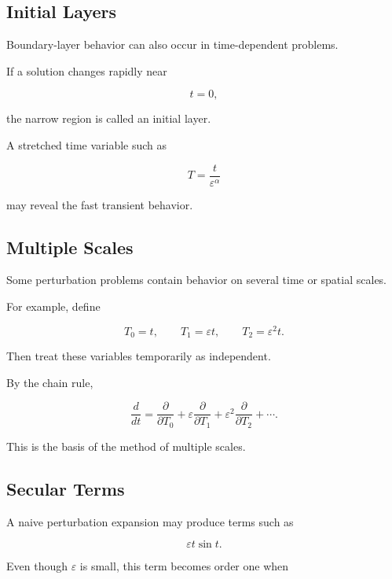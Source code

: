 \subsection{Initial Layers}
\label{subsec:initial-layers}

Boundary-layer behavior can also occur in time-dependent problems.

If a solution changes rapidly near

\[
t=0,
\]

the narrow region is called an initial layer.

A stretched time variable such as

\[
\boxed{
T=\frac{t}{\varepsilon^\alpha}
}
\]

may reveal the fast transient behavior.

\subsection{Multiple Scales}
\label{subsec:multiple-scales}

Some perturbation problems contain behavior on several time or spatial
scales.

For example, define

\[
\boxed{
T_0=t,
\qquad
T_1=\varepsilon t,
\qquad
T_2=\varepsilon^2t.
}
\]

Then treat these variables temporarily as independent.

By the chain rule,

\[
\boxed{
\frac{d}{dt}
=
\frac{\partial}{\partial T_0}
+
\varepsilon
\frac{\partial}{\partial T_1}
+
\varepsilon^2
\frac{\partial}{\partial T_2}
+\cdots.
}
\]

This is the basis of the method of multiple scales.

\subsection{Secular Terms}
\label{subsec:secular-terms}

A naive perturbation expansion may produce terms such as

\[
\boxed{
\varepsilon t\sin t.
}
\]

Even though \(\varepsilon\) is small, this term becomes order one when

